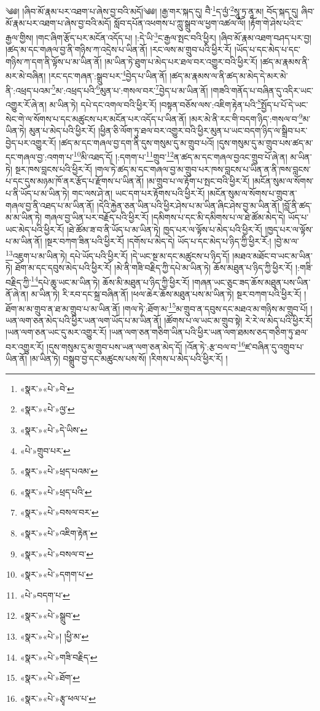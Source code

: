༄༅། །ཞིབ་མོ་རྣམ་པར་འཐག་པ་ཞེས་བྱ་བའི་མདོ།༄༅། །རྒྱ་གར་སྐད་དུ། བཻ་\footnote{«སྣར་»«པེ་»བེ་}ད་ལྱཾ་\footnote{«སྣར་»«པེ་»ལྱ་}སཱུ་ཏྲ་ནཱ་མ། བོད་སྐད་དུ། ཞིབ་མོ་རྣམ་པར་འཐག་པ་ཞེས་བྱ་བའི་མདོ། སློབ་དཔོན་འཕགས་པ་ཀླུ་སྒྲུབ་ལ་ཕྱག་འཚལ་ལོ། །རྟོག་གེ་ཤེས་པའི་ང་རྒྱལ་གྱིས། །གང་ཞིག་རྩོད་པར་མངོན་འདོད་པ། །:དེ་ཡི་\footnote{«སྣར་»«པེ་»དེ་ཡིས་}ང་རྒྱལ་སྤང་བའི་ཕྱིར། །ཞིབ་མོ་རྣམ་འཐག་བཤད་པར་བྱ། །ཚད་མ་དང་གཞལ་བྱ་ནི་གཉིས་ཀ་འདྲེས་པ་ཡིན་ནོ། །རང་ལས་མ་གྲུབ་པའི་ཕྱིར་རོ། །ཡོད་པ་དང་མེད་པ་དང་གཉིས་ཀ་དག་ནི་ལྟོས་པ་མ་ཡིན་ནོ། །མ་ཡིན་ཏེ་ཐུག་པ་མེད་པར་ཐལ་བར་འགྱུར་བའི་ཕྱིར་རོ། །ཚད་མ་རྣམས་ནི་མར་མེ་བཞིན། །རང་དང་གཞན་:སྒྲུབ་པར་\footnote{«པེ་»གྲུབ་པར་}བྱེད་པ་ཡིན་ནོ། །ཚད་མ་རྣམས་ལ་ནི་ཚད་མ་མེད་དེ་མར་མེ་ནི་:འཕྲད་པའམ་\footnote{«སྣར་»«པེ་»ཕྲད་པའམ་}མ་:འཕྲད་པའི་\footnote{«སྣར་»«པེ་»ཕྲད་པའི་}མུན་པ་:གསལ་བར་\footnote{«སྣར་»«པེ་»བསལ་བར་}བྱེད་པ་མ་ཡིན་ནོ། །གཟའི་གནོད་པ་བཞིན་དུ་འདིར་ཡང་འགྱུར་རོ་ཞེ་ན། མ་ཡིན་ཏེ། དཔེ་དང་འགལ་བའི་ཕྱིར་རོ། །བསྟན་བཅོས་ལས་:འཇིག་རྟེན་པའི་\footnote{«སྣར་»«པེ་»འཇིག་རྟེན་}སྤྱོད་པ་པོ་དེ་ཡང་སེང་གེ་ལ་སོགས་པ་དང་མཚུངས་པར་མངོན་པར་འདོད་པ་ཡིན་ནོ། །མར་མེ་ནི་རང་གི་བདག་ཉིད་:གསལ་བ་\footnote{«སྣར་»«པེ་»བསལ་བ་}མ་ཡིན་ཏེ། མུན་པ་མེད་པའི་ཕྱིར་རོ། །ཕྱིན་ཅི་ལོག་ཏུ་ཐལ་བར་འགྱུར་བའི་ཕྱིར་མུན་པ་ཡང་བདག་ཉིད་ལ་སྒྲིབ་པར་བྱེད་པར་འགྱུར་རོ། །ཚད་མ་དང་གཞལ་བྱ་དག་ནི་དུས་གསུམ་དུ་མ་གྲུབ་པའོ། །དུས་གསུམ་དུ་མ་གྲུབ་པས་ཚད་མ་དང་གཞལ་བྱ་:འགག་པ་\footnote{«སྣར་»«པེ་»དགག་པ་}མི་འཐད་དོ། །:དགག་པ་\footnote{«པེ་»བདག་པ་}གྲུབ་\footnote{«སྣར་»«པེ་»སྒྲུབ་}ན་ཚད་མ་དང་གཞལ་བྱའང་གྲུབ་པོ་ཞེ་ན། མ་ཡིན་ཏེ། སྔར་ཁས་བླངས་པའི་ཕྱིར་རོ། །གལ་ཏེ་ཚད་མ་དང་གཞལ་བྱ་མ་གྲུབ་པར་ཁས་བླངས་པ་ཡིན་ན་ནི་ཁས་བླངས་པ་དང་དུས་མཉམ་ཁོ་ནར་རྩོད་པ་རྫོགས་པ་ཡིན་ནོ། །མ་གྲུབ་པ་ལ་རྟོག་པ་སྤང་བའི་ཕྱིར་རོ། །མངོན་སུམ་ལ་སོགས་པ་ནི་ཡོད་པ་མ་ཡིན་ཏེ། གང་ལས་ཤེ་ན། ཡང་དག་པར་རྟོགས་པའི་ཕྱིར་རོ། །མངོན་སུམ་ལ་སོགས་པ་གྲུབ་ན་གཞལ་བྱ་ནི་འཐད་པ་མ་ཡིན་ནོ། །དེའི་རྐྱེན་ཅན་ཡིན་པའི་ཕྱིར་ཤེས་པ་མ་ཡིན་ཞིང་ཤེས་བྱ་མ་ཡིན་ནོ། །བློ་ནི་ཚད་མ་མ་ཡིན་ཏེ། གཞལ་བྱ་ཡིན་པར་བརྗོད་པའི་ཕྱིར་རོ། །དམིགས་པ་དང་མི་དམིགས་པ་ལ་ཐེ་ཚོམ་མེད་དེ། ཡོད་པ་ཡང་མེད་པའི་ཕྱིར་རོ། །ཐེ་ཚོམ་ཟ་བ་ནི་ཡོད་པ་མ་ཡིན་ཏེ། ཁྱད་པར་ལ་ལྟོས་པ་མེད་པའི་ཕྱིར་རོ། །ཁྱད་པར་ལ་ལྟོས་པ་མ་ཡིན་ནོ། །སྔར་བཀག་ཟིན་པའི་ཕྱིར་རོ། །དགོས་པ་མེད་དེ། ཡོད་པ་དང་མེད་པ་ཉིད་ཀྱི་ཕྱིར་རོ:། །བྱེ་མ་ལ་\footnote{«སྣར་»«པེ་»། །ཕྱི་མ་}འཇུག་པ་མ་ཡིན་ཏེ། དཔེ་ཡོད་པའི་ཕྱིར་རོ། །དེ་ཡང་སྔ་མ་དང་མཚུངས་པ་ཉིད་དོ། །མཐའ་མཐོང་བ་ཡང་མ་ཡིན་ཏེ། ཐོག་མ་དང་དབུས་མེད་པའི་ཕྱིར་རོ། །མེ་ནི་གཟི་བརྗིད་ཀྱི་དཔེ་མ་ཡིན་ཏེ། ཆོས་མཐུན་པ་ཉིད་ཀྱི་ཕྱིར་རོ། །:གཟི་བརྗིད་ཀྱི་\footnote{«སྣར་»«པེ་»གཟི་བརྗིད་}དཔེ་ཆུ་ཡང་མ་ཡིན་ཏེ། ཆོས་མི་མཐུན་པ་ཉིད་ཀྱི་ཕྱིར་རོ། །གཞན་ཡང་ཅུང་ཟད་ཆོས་མཐུན་པས་ཡིན་ནོ་ཞེ་ན། མ་ཡིན་ཏེ། རི་རབ་དང་སྐྲ་བཞིན་ནོ། །ཕལ་ཆེར་ཆོས་མཐུན་པས་མ་ཡིན་ཏེ། སྔར་བཀག་པའི་ཕྱིར་རོ། །ཐོག་མ་མ་གྲུབ་ན་ཐ་མ་གྲུབ་པ་མ་ཡིན་ནོ། །གལ་ཏེ་:ཐོག་མ་\footnote{«སྣར་»«པེ་»ཐོག་}མ་གྲུབ་ན་དབུས་དང་མཐའ་མ་གཉིས་མ་གྲུབ་པོ། །ཡན་ལག་ཅན་མེད་པའི་ཕྱིར་ཡན་ལག་ཡོད་པ་མ་ཡིན་ནོ། །ཚོགས་པ་ལ་ཡང་མ་གྲུབ་སྟེ། རེ་རེ་ལ་མེད་པའི་ཕྱིར་རོ། །ཡན་ལག་ཅན་ཡང་དུ་མར་འགྱུར་རོ། །ཡན་ལག་ཅན་གཅིག་ཡིན་པའི་ཕྱིར་ཡན་ལག་ཐམས་ཅད་གཅིག་ཏུ་ཐལ་བར་འགྱུར་རོ། །དུས་གསུམ་དུ་མ་གྲུབ་པས་ཡན་ལག་ཅན་མེད་དོ། །འོན་ཏེ་:རྩ་བལ་བ་\footnote{«སྣར་»«པེ་»རྩྭ་ཕལ་པ་}ཛ་བཞིན་དུ་འགྲུབ་པ་ཡིན་ནོ། །མ་ཡིན་ཏེ། བསྒྲུབ་བྱ་དང་མཚུངས་པས་སོ། །རིགས་པ་མེད་པའི་ཕྱིར་རོ། །
